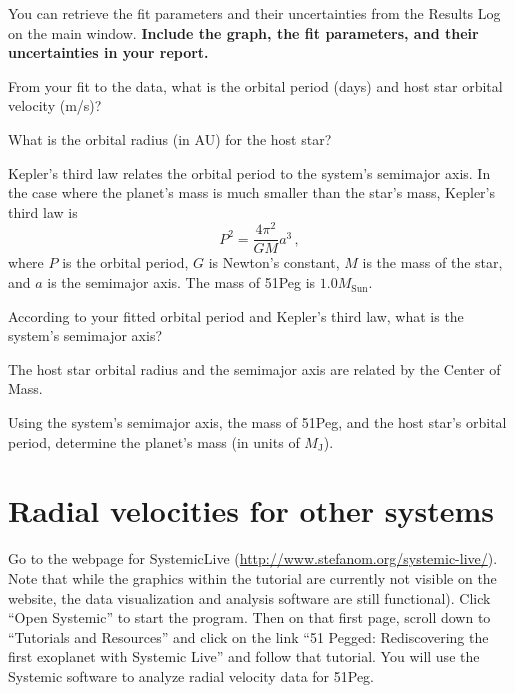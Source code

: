 You can retrieve the fit parameters and their uncertainties from the Results Log on the main window. \textbf{Include the graph, the fit parameters, and their uncertainties in your report.}

\begin{steps}
	\item From your fit to the data, what is the orbital period (days) and host star orbital velocity (m/s)?
	
	\item What is the orbital radius (in AU) for the host star?
\end{steps}

Kepler's third law relates the orbital period to the system's semimajor axis. In the case where the planet’s mass is much smaller than the star’s mass, Kepler's third law is
\begin{equation}
 P^2=\frac{4 \pi^2}{GM} a^3 \,,
\end{equation}
where $P$ is the orbital period, $G$ is Newton's constant, $M$ is the mass of the star, and $a$ is the semimajor axis. The mass of 51Peg is $1.0 M_\textrm{Sun}$.

\begin{steps}
	\item According to your fitted orbital period and Kepler's third law, what is the system's semimajor axis?
\end{steps}

The host star orbital radius and the semimajor axis are related by the Center of Mass.

\begin{steps}
	\item Using the system's semimajor axis, the mass of 51Peg, and the host star’s orbital period, determine the planet’s mass (in units of $M_\textrm{J}$).
\end{steps}

\section{Radial velocities for other systems}

Go to the webpage for SystemicLive (\url{http://www.stefanom.org/systemic-live/}). Note that while the graphics within the tutorial are currently not visible on the website, the data visualization and analysis software are still functional). Click ``Open Systemic'' to start the program. Then on that first page, scroll down to ``Tutorials and Resources'' and click on the link ``51 Pegged: Rediscovering the first exoplanet with Systemic Live'' and follow that tutorial. You will use the Systemic software to analyze radial velocity data for 51Peg.

